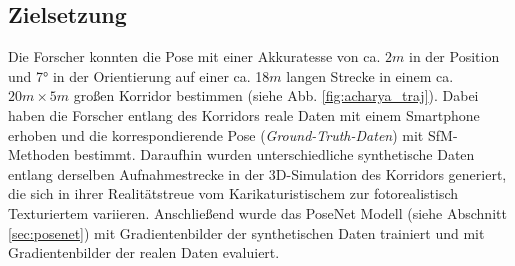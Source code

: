 \subsection{Zielsetzung}

Die Forscher \citet{acharyaBIMPoseNetIndoorCamera2019} konnten die Pose mit einer Akkuratesse von ca. $2m$ in der Position und 7° in der Orientierung auf einer ca. 18$m$ langen Strecke in einem ca. $20m \times 5m$ großen Korridor bestimmen (siehe Abb. \ref{fig:acharya_traj}). Dabei haben die Forscher entlang des Korridors reale Daten mit einem Smartphone erhoben und die korrespondierende Pose (\textit{Ground-Truth-Daten}) mit SfM-Methoden bestimmt. Daraufhin wurden unterschiedliche synthetische Daten entlang derselben Aufnahmestrecke in der 3D-Simulation des Korridors generiert, die sich in ihrer Realitätstreue vom Karikaturistischem zur fotorealistisch Texturiertem variieren. Anschließend wurde das PoseNet Modell (siehe Abschnitt \ref{sec:posenet}) mit Gradientenbilder der synthetischen Daten trainiert und mit Gradientenbilder der realen Daten evaluiert.
